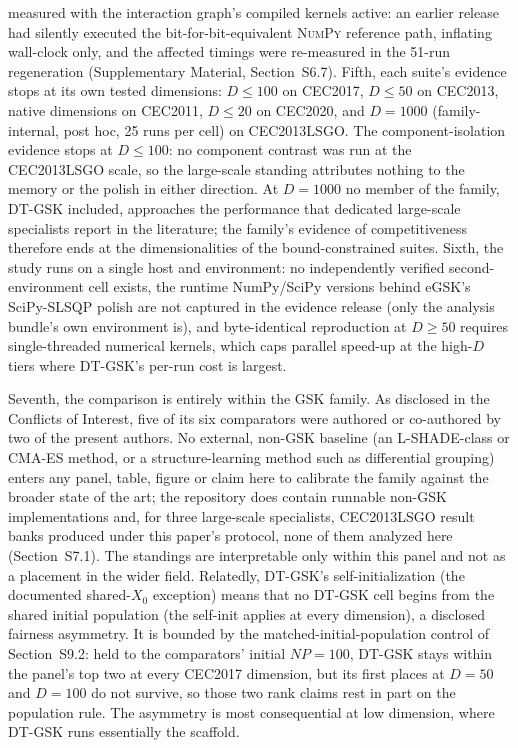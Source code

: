 \documentclass[10pt,a4paper]{article}
\newcommand{\dtgsk}{DT-GSK}
\newcommand{\egsk}{eGSK}
\begin{document}
measured with the interaction graph's compiled kernels active: an
earlier release had silently executed the bit-for-bit-equivalent
\textsc{NumPy} reference path, inflating wall-clock only, and the
affected timings were re-measured in the 51-run regeneration
(Supplementary Material, Section~S6.7). 
Fifth, each suite's evidence stops at its own tested dimensions:
$D \le 100$ on CEC2017, $D \le 50$ on CEC2013, native dimensions on CEC2011,
$D \le 20$ on CEC2020, and $D = 1000$ (family-internal, post hoc, 25 runs
per cell) on CEC2013LSGO. The component-isolation evidence stops at
$D \le 100$: no component contrast was run at the CEC2013LSGO scale, so
the large-scale standing attributes nothing to the memory or the polish
in either direction. At $D = 1000$ no member of the family, \dtgsk{}
included, approaches the performance that dedicated large-scale
specialists report in the literature; the family's evidence of
competitiveness therefore ends at the dimensionalities of the
bound-constrained suites. 
Sixth, the study runs on a single host and environment: no
independently verified second-environment cell exists, the runtime
NumPy/SciPy versions behind \egsk{}'s SciPy-SLSQP polish are not
captured in the evidence release (only the analysis bundle's own
environment is), and byte-identical reproduction at $D \geq 50$ requires
single-threaded numerical kernels, which caps parallel speed-up at the
high-$D$ tiers where \dtgsk{}'s per-run cost is largest.

Seventh, the comparison is entirely within the GSK family. As
disclosed in the Conflicts of Interest, five of its six comparators were
authored or co-authored by two of the present authors. No external, non-GSK
baseline (an L-SHADE-class or CMA-ES method, or a structure-learning
method such as differential grouping) enters any panel, table, figure or
claim here to calibrate the family against the broader state of the art; the
repository does contain runnable non-GSK implementations and, for three
large-scale specialists, CEC2013LSGO result banks produced under this paper's
protocol, none of them analyzed here (Section~S7.1).  The standings are
interpretable only within this panel and not as a placement in the
wider field. Relatedly, \dtgsk{}'s self-initialization (the documented
shared-$X_{0}$ exception) means that no \dtgsk{} cell begins from the
shared initial population (the self-init applies at every dimension),
a disclosed fairness asymmetry.  It is bounded by the
matched-initial-population control of Section~S9.2: held to the comparators'
initial $NP = 100$, \dtgsk{} stays within the panel's top two at every
CEC2017 dimension, but its first places at $D = 50$ and $D = 100$ do not
survive, so those two rank claims rest in part on the population rule.  The
asymmetry is most consequential at low dimension, where \dtgsk{} runs
essentially the scaffold.
\end{document}
